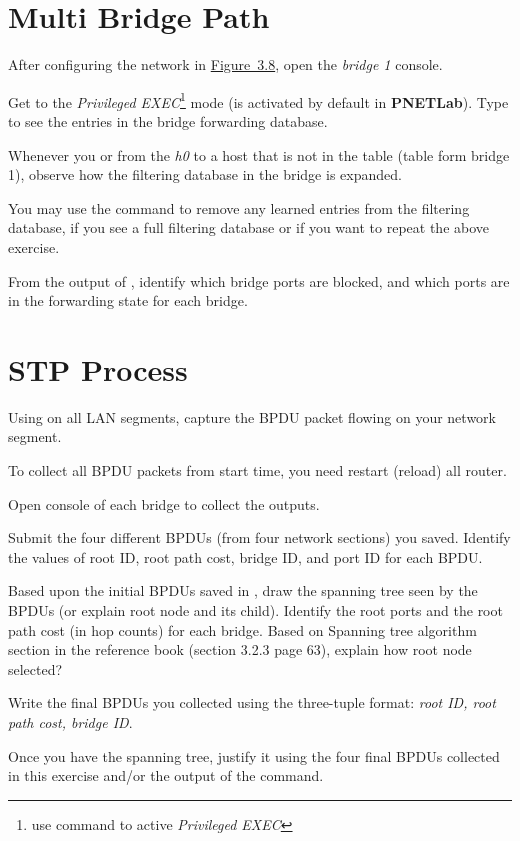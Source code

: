 \documentclass{../UTNetLab}
\begin{document}
\section{Multi Bridge Path}
After configuring the network in \hyperref[fig:3.8]{Figure~3.8}, open the \textit{bridge 1} console.

Get to the \textit{Privileged EXEC}\footnote{use  command to active \textit{Privileged EXEC}} mode (is activated by default in \textbf{PNETLab}).
Type  to see the entries in the bridge forwarding database.

Whenever you  or  from the \textit{h0} to a host that is not in the table (table form bridge 1), observe how the filtering database in the bridge is expanded.

You may use the  command to remove any learned entries from the filtering database, if you see a full filtering database or if you want to repeat the above exercise.

\begin{report}
    \item From the output of , identify which bridge ports are blocked, and which ports are in the forwarding state for each bridge.
\end{report}

\section{STP Process}
Using  on all LAN segments, capture the BPDU packet flowing on your network segment.

To collect all BPDU packets from start time, you need restart (reload) all router.

Open console of each bridge to collect the  outputs.

\begin{report}
    \item Submit the four different BPDUs (from four network sections) you saved.
    Identify the values of root ID, root path cost, bridge ID, and port ID for each BPDU.

    \item Based upon the initial BPDUs saved in , draw the spanning tree seen by the BPDUs (or explain root node and its child).
    Identify the root ports and the root path cost (in hop counts) for each bridge.
    Based on Spanning tree algorithm section in the reference book (section 3.2.3 page 63), explain how root node selected?

    \item Write the final BPDUs you collected using the three-tuple format: \textit{{root ID, root path cost, bridge ID}}.

    \item Once you have the spanning tree, justify it using the four final BPDUs collected in this exercise and/or the output of the  command.
\end{report}
\end{document}
